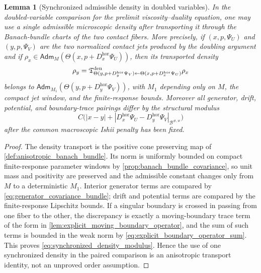 \documentclass[12pt, letterpaper]{amsart}
\newcommand{\Bcal}{\mathcal{B}}
\newcommand{\Hor}{\mathrm{hor}}
\newcommand{\Adm}{\mathsf{Adm}}
\theoremstyle{plain}
\newtheorem{lemma}[theorem]{Lemma}
\theoremstyle{definition}
\theoremstyle{remark}
\begin{document}
\begin{lemma}[Synchronized admissible density in doubled variables]
\label{lem:synchronized_density_doubling}
In the doubled-variable comparison for the prelimit viscosity--duality equation,
one may use a single admissible microscopic density after transporting it
through the Banach-bundle charts of the two contact fibers.  More precisely, if
\((x,p,\Psi_U)\) and \((y,p,\Psi_V)\) are the two normalized contact jets
produced by the doubling argument and if
\(\rho_x\in\Adm_M(\Theta(x,p+D_x^{\Hor}\Psi_U))\), then its transported density
\begin{equation}
    \rho_y=\mathfrak T^{\rm den}_{\Theta(y,p+D_y^{\Hor}\Psi_V)
          \leftarrow \Theta(x,p+D_x^{\Hor}\Psi_U)}\rho_x
\end{equation}
belongs to \(\Adm_{M_1}(\Theta(y,p+D_y^{\Hor}\Psi_V))\), with \(M_1\) depending
only on \(M\), the compact jet window, and the finite-response bounds.  Moreover
all generator, drift, potential, and boundary-trace pairings differ by the
structural modulus
\begin{equation}
\label{eq:synchronized_density_modulus}
    C\bigl(|x-y|+|D_x^{\Hor}\Psi_U-D_y^{\Hor}\Psi_V|_{\Bcal^{\#,w}}\bigr)
\end{equation}
after the common macroscopic Ishii penalty has been fixed.
\end{lemma}

\begin{proof}
The density transport is the positive cone preserving map of
\cref{def:anisotropic_banach_bundle}.  Its norm is uniformly bounded on compact
finite-response parameter windows by \cref{prop:banach_bundle_covariance}, so
unit mass and positivity are preserved and the admissible constant changes only
from \(M\) to a deterministic \(M_1\).  Interior generator terms are compared by
\eqref{eq:generator_covariance_bundle}; drift and potential terms are compared
by the finite-response Lipschitz bounds.  If a singular boundary is crossed in
passing from one fiber to the other, the discrepancy is exactly a
moving-boundary trace term of the form in
\cref{lem:explicit_moving_boundary_operator}, and the sum of such terms is
bounded in the weak norm by \eqref{eq:explicit_boundary_operator_sum}.  This
proves \eqref{eq:synchronized_density_modulus}.  Hence the use of one
synchronized density in the paired comparison is an anisotropic transport
identity, not an unproved order assumption.
\end{proof}
\end{document}
